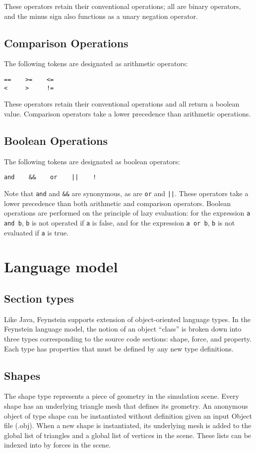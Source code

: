 \documentclass[letterpaper]{article}
\begin{document}
These operators retain their conventional operations; all are binary
operators, and the minus sign also functions as a unary negation
operator.

\subsection{Comparison Operations}

The following tokens are designated as arithmetic operators:
\begin{verbatim}
==    >=    <=   
<     >     !=
\end{verbatim}

These operators retain their conventional operations and all return a
boolean value. Comparison operators take a lower precedence than
arithmetic operations.

\subsection{Boolean Operations}

The following tokens are designated as boolean operators:
\begin{verbatim}
and    &&    or    ||    !
\end{verbatim}

Note that \texttt{and} and \texttt{\&\&} are synonymous, as are
\texttt{or} and \texttt{||}. These operators take a lower precedence
than both arithmetic and comparison operators. Boolean operations are
performed on the principle of lazy evaluation: for the expression
\texttt{a and b}, \texttt{b} is not operated if \texttt{a} is false,
and for the expression \texttt{a or b}, \texttt{b} is not evaluated if
\texttt{a} is true.

\section{Language model}

\subsection{Section types}
Like Java, Feynstein supports extension of object-oriented language
types. In the Feynstein language model, the notion of an object
``class'' is broken down into three types corresponding to the source
code sections: shape, force, and property. Each type has properties
that must be defined by any new type definitions.

\subsection{Shapes}
The shape type represents a piece of geometry in the simulation
scene. Every shape has an underlying triangle mesh that defines its
geometry. An anonymous object of type shape can be instantiated
without definition given an input Object file (.obj). When a new shape
is instantiated, its underlying mesh is added to the global list of
triangles and a global list of vertices in the scene. These lists can
be indexed into by forces in the scene.
\end{document}

